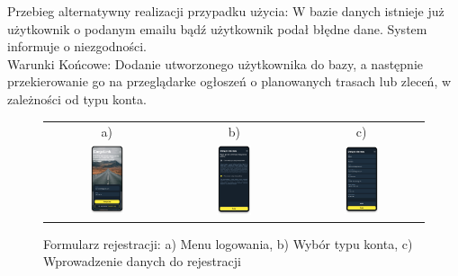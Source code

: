 Przebieg alternatywny realizacji przypadku użycia: W bazie danych istnieje już użytkownik o podanym emailu bądź użytkownik podał błędne dane. System informuje o niezgodności. \\
Warunki Końcowe: Dodanie utworzonego użytkownika do bazy, a następnie przekierowanie go na przeglądarke ogłoszeń o planowanych trasach lub zleceń, w zależności od typu konta.
\begin{figure}[H]
 \centering
  \begin{tabular}{@{}ccc@{}}
  a) & b) & c)\\
  \includegraphics[width=0.3\textwidth]{rozdzial1/logowanie.png} &
  \includegraphics[width=0.3\textwidth]{rozdzial1/wybor_1.png} &
  \includegraphics[width=0.3\textwidth]{rozdzial1/rejestracja.png}
  \end{tabular}
 \caption{Formularz rejestracji: a) Menu logowania, b) Wybór typu konta, c) Wprowadzenie danych do rejestracji}
 \label{fig:Formularz rejestracji - abc}
\end{figure}
